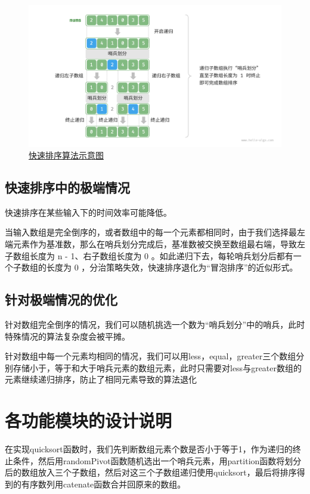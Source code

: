 \documentclass{ctexart}
\begin{document}
    \begin{figure}[h] %
        \centering
        \includegraphics[width=1\textwidth]{algo.png}
        \caption{\href{https://www.hello-algo.com/chapter_sorting/quick_sort/}{快速排序算法示意图}}
    \end{figure}
    \subsection{快速排序中的极端情况}
    快速排序在某些输入下的时间效率可能降低。
    
    当输入数组是完全倒序的，或者数组中的每一个元素都相同时，由于我们选择最左端元素作为基准数，那么在哨兵划分完成后，基准数被交换至数组最右端，导致左子数组长度为 n - 1、右子数组长度为 0 。如此递归下去，每轮哨兵划分后都有一个子数组的长度为 0 ，分治策略失效，快速排序退化为“冒泡排序”的近似形式。
    
    
    \subsection{针对极端情况的优化}
    针对数组完全倒序的情况，我们可以随机挑选一个数为“哨兵划分”中的哨兵，此时特殊情况的算法复杂度会被平摊。
    
    针对数组中每一个元素均相同的情况，我们可以用less，equal，greater三个数组分别存储小于，等于和大于哨兵元素的数组元素，此时只需要对less与greater数组的元素继续递归排序，防止了相同元素导致的算法退化
    
    \section{各功能模块的设计说明}
    在实现quicksort函数时，我们先判断数组元素个数是否小于等于1，作为递归的终止条件，然后用randomPivot函数随机选出一个哨兵元素，用partition函数将划分后的数组放入三个子数组，然后对这三个子数组递归使用quicksort，最后将排序得到的有序数列用catenate函数合并回原来的数组。
    
\end{document}
